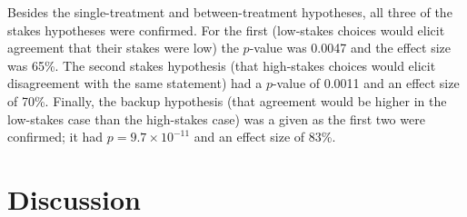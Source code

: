 Besides the single-treatment and between-treatment hypotheses, all three of the stakes hypotheses were confirmed.
%
For the first (low-stakes choices would elicit agreement that their stakes were low) the $p$-value was 0.0047 and the effect size was 65\%.
%
The second stakes hypothesis (that high-stakes choices would elicit disagreement with the same statement) had a $p$-value of 0.0011 and an effect size of 70\%.
%
Finally, the backup hypothesis (that agreement would be higher in the low-stakes case than the high-stakes case) was a given as the first two were confirmed; it had $p = 9.7\times10^{-11}$ and an effect size of 83\%.


\section{Discussion}

